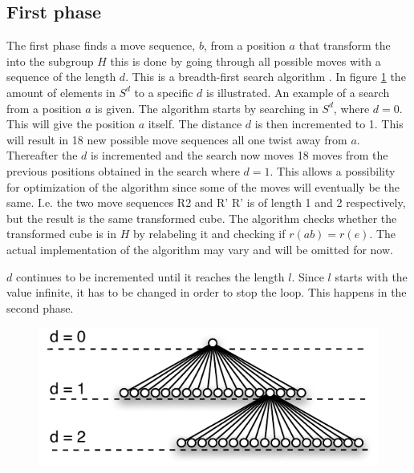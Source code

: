 \subsection{First phase}
\label{sub:firstPhase}
The first phase finds a move sequence, $b$, from a position $a$ that transform the \rubik into the subgroup $H$ this is done by going through all possible moves with a sequence of the length $d$. This is a breadth-first search algorithm \cite[pp. 729-731]{Rosen07}.
In figure \ref{fig:searchExpansion} the amount of elements in $S^d$ to a specific $d$ is illustrated.
An example of a search from a position $a$ is given. The algorithm starts by searching in $S^{d}$, where $d =  0$. This will give the position $a$ itself. The distance $d$ is then incremented to 1. This will result in 18 new possible move sequences all one twist away from $a$. Thereafter the $d$ is incremented and the search now moves 18 moves from the previous positions obtained in the search where $d = 1$. This allows a possibility for optimization of the algorithm since some of the moves will eventually be the same. I.e. the two move sequences R2 and R' R' is of length 1 and 2 respectively, but the result is the same transformed cube. The algorithm checks whether the transformed cube is in $H$ by relabeling it and checking if $r(ab) = r(e)$. The actual implementation of the algorithm may vary and will be omitted for now.

$d$ continues to be incremented until it reaches the length $l$. Since $l$ starts with the value infinite, it has to be changed in order to stop the loop. This happens in the second phase.

\begin{figure}[!hb]
	\centering
		\includegraphics[scale=0.75]{input/pics/searchExpansion.pdf}
	\caption{}
	\label{fig:searchExpansion}
\end{figure}


